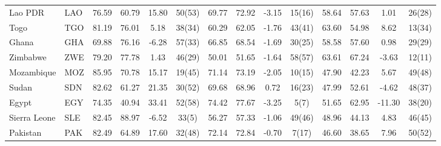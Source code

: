 {\begin{longtable}{m{2.3cm}lcccc|cccc|cccc}
Lao PDR                           & LAO           & 76.59            & 60.79              & 15.80            & 50(53)           & 69.77    & 72.92      & -3.15    & 15(16)   & 58.64           & 57.63             & 1.01            & 26(28)          \\
Togo                              & TGO           & 81.19            & 76.01              & 5.18             & 38(34)           & 60.29    & 62.05      & -1.76    & 43(41)   & 63.60           & 54.98             & 8.62            & 13(34)          \\
Ghana                             & GHA           & 69.88            & 76.16              & -6.28            & 57(33)           & 66.85    & 68.54      & -1.69    & 30(25)   & 58.58           & 57.60             & 0.98            & 29(29)          \\
Zimbabwe                          & ZWE           & 79.20            & 77.78              & 1.43             & 46(29)           & 50.01    & 51.65      & -1.64    & 58(57)   & 63.61           & 67.24             & -3.63           & 12(11)          \\
Mozambique                        & MOZ           & 85.95            & 70.78              & 15.17            & 19(45)           & 71.14    & 73.19      & -2.05    & 10(15)   & 47.90           & 42.23             & 5.67            & 49(48)          \\
Sudan                             & SDN           & 82.62            & 61.27              & 21.35            & 30(52)           & 69.68    & 68.96      & 0.72     & 16(23)   & 47.99           & 52.61             & -4.62           & 48(37)          \\
Egypt                             & EGY           & 74.35            & 40.94              & 33.41            & 52(58)           & 74.42    & 77.67      & -3.25    & 5(7)     & 51.65           & 62.95             & -11.30          & 38(20)          \\
Sierra Leone                      & SLE           & 82.45            & 88.97              & -6.52            & 33(5)            & 56.27    & 57.33      & -1.06    & 49(46)   & 48.96           & 44.13             & 4.83            & 46(45)          \\
Pakistan                          & PAK           & 82.49            & 64.89              & 17.60            & 32(48)           & 72.14    & 72.84      & -0.70    & 7(17)    & 46.60           & 38.65             & 7.96            & 50(52)          \\

\end{longtable}}
